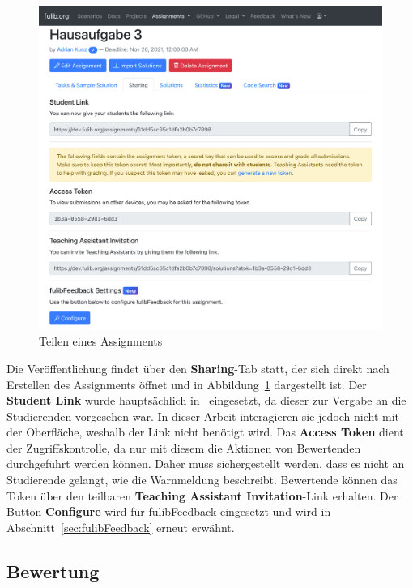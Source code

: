 \begin{figure}
    \centering
    \includegraphics[width=\textwidth]{images/assignment-share}
    \caption{Teilen eines Assignments}
    \label{fig:assignment-share}
\end{figure}

Die Veröffentlichung findet über den \textbf{Sharing}-Tab statt, der sich direkt nach Erstellen des Assignments öffnet und in Abbildung~\ref{fig:assignment-share} dargestellt ist.
Der \textbf{Student Link} wurde hauptsächlich in~\cite{bachelor-thesis} eingesetzt, da dieser zur Vergabe an die Studierenden vorgesehen war.
In dieser Arbeit interagieren sie jedoch nicht mit der Oberfläche, weshalb der Link nicht benötigt wird.
Das \textbf{Access Token} dient der Zugriffskontrolle, da nur mit diesem die Aktionen von Bewertenden durchgeführt werden können.
Daher muss sichergestellt werden, dass es nicht an Studierende gelangt, wie die Warnmeldung beschreibt.
Bewertende können das Token über den teilbaren \textbf{Teaching Assistant Invitation}-Link erhalten.
Der Button \textbf{Configure} wird für fulibFeedback eingesetzt und wird in Abschnitt~\ref{sec:fulibFeedback} erneut erwähnt.

\subsection{Bewertung}\label{subsec:grading}

